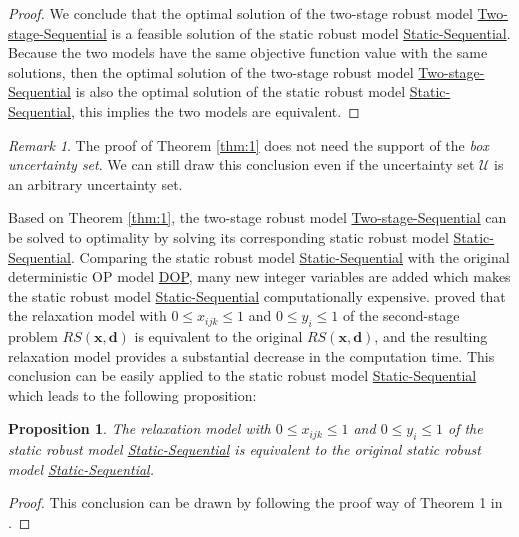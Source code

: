 \documentclass[preprint,review,10pt,round,authoryear]{elsarticle}\usepackage[]{graphicx}\usepackage[]{color}
\theoremstyle{plain}
\newtheorem{prop}{Proposition}
\theoremstyle{definition}
\theoremstyle{remark}
\newtheorem*{rem}{Remark}
\begin{document}
\begin{proof}
We conclude that the optimal solution of the two-stage robust model \hyperref[2ro:1]{Two-stage-Sequential} is a feasible solution of the static robust model \hyperref[sro:1]{Static-Sequential}. Because the two models have the same objective function value with the same solutions, then the optimal solution of the two-stage robust model \hyperref[2ro:1]{Two-stage-Sequential} is also the optimal solution of the static robust model \hyperref[sro:1]{Static-Sequential}, this implies the two models are equivalent.
\end{proof}

\begin{rem}
The proof of Theorem \ref{thm:1} does not need the support of the \emph{box uncertainty set}. We can still draw this conclusion even if the uncertainty set $\mathcal{U}$ is an arbitrary uncertainty set.
\end{rem}

Based on Theorem \ref{thm:1}, the two-stage robust model \hyperref[2ro:1]{Two-stage-Sequential} can be solved to optimality by solving its corresponding static robust model \hyperref[sro:1]{Static-Sequential}. Comparing the static robust model \hyperref[sro:1]{Static-Sequential} with the original deterministic OP model \hyperref[eq:op1]{DOP}, many new integer variables are added which makes the static robust model \hyperref[sro:1]{Static-Sequential} computationally expensive. \cite{evers2014two} proved that the relaxation model with $0\leq x_{ijk}\leq 1$ and $0\leq y_i\leq 1$ of the second-stage problem $RS(\mathbf{x},\mathbf{d})$ is equivalent to the original $RS(\mathbf{x},\mathbf{d})$, and the resulting relaxation model provides a substantial decrease in the computation time. This conclusion can be easily applied to the static robust model \hyperref[sro:1]{Static-Sequential} which leads to the following proposition:


\begin{prop}
The relaxation model with $0\leq x_{ijk}\leq 1$ and $0\leq y_i\leq 1$ of the static robust model \hyperref[sro:1]{Static-Sequential} is equivalent to the original static robust model \hyperref[sro:1]{Static-Sequential}.
\end{prop}
\begin{proof}
This conclusion can be drawn by following the proof way of Theorem 1 in \cite{evers2014two}.
\end{proof}
\end{document}
